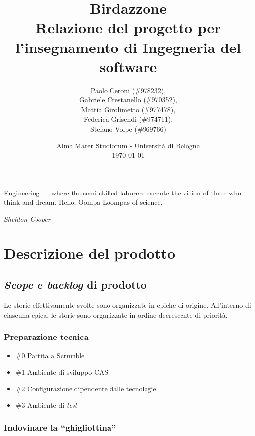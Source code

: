 \documentclass{article}
\title{
	\textbf{
		Birdazzone \\
	}
	\textbf{\large
		Relazione del progetto per l'insegnamento di \break
		Ingegneria del software
	}
}
\author{
	Paolo Ceroni (\#978232), \\
	Gabriele Crestanello (\#970352), \\
	Mattia Girolimetto (\#977478), \\
	Federica Grisendi (\#974711), \\
	Stefano Volpe (\#969766)
}
\date{
	Alma Mater Studiorum - Universit\`a di Bologna \\
	\today
}
\begin{document}
\maketitle

\epigraph{
	Engineering --- where the semi-skilled laborers execute the vision of those
	who think and dream. Hello, Oompa-Loompas of science.
}{\textit{Sheldon Cooper}}

\thispagestyle{empty}
\pagebreak

\tableofcontents

\pagebreak

\section{Descrizione del prodotto}

\subsection{\emph{Scope e backlog} di prodotto}

Le storie effettivamente svolte sono organizzate in epiche di origine.
All'interno di ciascuna epica, le storie sono organizzate in ordine decrescente
di priorità.

\subsubsection{Preparazione tecnica}

\begin{itemize}
	\item \#0 Partita a Scrumble
	\item \#1 Ambiente di sviluppo CAS
	\item \#2 Configurazione dipendente dalle tecnologie
	\item \#3 Ambiente di \emph{test}
\end{itemize}

\subsubsection{Indovinare la ``ghigliottina''}
\end{document}
